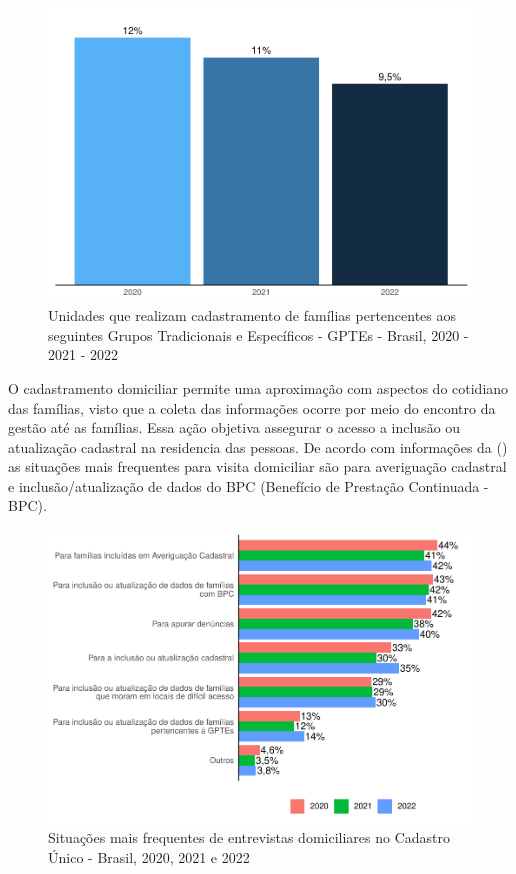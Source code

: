 \documentclass[
  brazilian]{report}
\begin{document}
\begin{figure}
\includegraphics{Censo-SUAS-2022_files/figure-latex/gptes-cadunico-1} \caption[Unidades que realizam cadastramento de famílias pertencentes aos seguintes Grupos Tradicionais e Específicos - GPTEs - Brasil, 2020 - 2021 - 2022]{Unidades que realizam cadastramento de famílias pertencentes aos seguintes Grupos Tradicionais e Específicos - GPTEs - Brasil, 2020 - 2021 - 2022}\label{fig:gptes-cadunico}
\end{figure}

O cadastramento domiciliar permite uma aproximação com aspectos do
cotidiano das famílias, visto que a coleta das informações ocorre por
meio do encontro da gestão até as famílias. Essa ação objetiva assegurar
o acesso a inclusão ou atualização cadastral na residencia das pessoas.
De acordo com informações da () as situações mais
frequentes para visita domiciliar são para averiguação cadastral e
inclusão/atualização de dados do BPC (Benefício de Prestação Continuada
- BPC).

\begin{figure}
\includegraphics{Censo-SUAS-2022_files/figure-latex/visit_dom-1} \caption[Situações mais frequentes de entrevistas domiciliares no Cadastro Único - Brasil, 2020, 2021 e 2022]{Situações mais frequentes de entrevistas domiciliares no Cadastro Único - Brasil, 2020, 2021 e 2022}\label{fig:visit_dom}
\end{figure}
\end{document}
